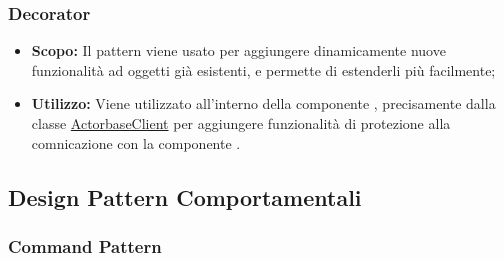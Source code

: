 \documentclass{scalatekids-article}
\begin{document}
\subsubsection{Decorator}

\begin{itemize}
\item \textbf{Scopo:} Il pattern  viene usato per aggiungere dinamicamente
  nuove funzionalità ad oggetti già esistenti, e permette di estenderli più facilmente;

\item \textbf{Utilizzo:} Viene utilizzato all'interno della componente
  , precisamente dalla classe
  \hyperref[sec:actorbase::driver::client::ActorbaseClient]{ActorbaseClient} per
  aggiungere funzionalità di protezione  alla comnicazione
   con la componente .
\end{itemize}

\subsection{Design Pattern Comportamentali}

\subsubsection{Command Pattern}

\label{sec:CommandPattern}
\end{document}
